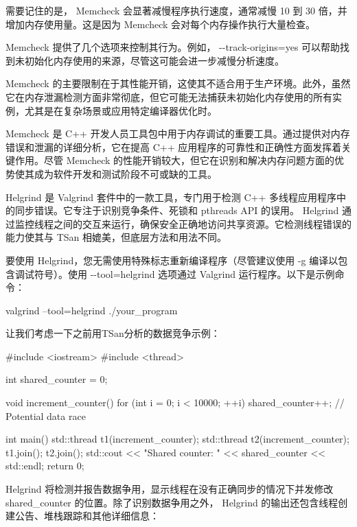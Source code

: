 
需要记住的是， Memcheck 会显著减慢程序执行速度，通常减慢 10 到 30 倍，并增加内存使用量。这是因为 Memcheck 会对每个内存操作执行大量检查。

Memcheck 提供了几个选项来控制其行为。例如， -{}-track-origins=yes 可以帮助找到未初始化内存使用的来源，尽管这可能会进一步减慢分析速度。

Memcheck 的主要限制在于其性能开销，这使其不适合用于生产环境。此外，虽然它在内存泄漏检测方面非常彻底，但它可能无法捕获未初始化内存使用的所有实例，尤其是在复杂场景或应用特定编译器优化时。

Memcheck 是 C++ 开发人员工具包中用于内存调试的重要工具。通过提供对内存错误和泄漏的详细分析，它在提高 C++ 应用程序的可靠性和正确性方面发挥着关键作用。尽管 Memcheck 的性能开销较大，但它在识别和解决内存问题方面的优势使其成为软件开发和测试阶段不可或缺的工具。


Helgrind 是 Valgrind 套件中的一款工具，专门用于检测 C++ 多线程应用程序中的同步错误。它专注于识别竞争条件、死锁和 pthreads API 的误用。 Helgrind 通过监控线程之间的交互来运行，确保安全正确地访问共享资源。它检测线程错误的能力使其与 TSan 相媲美，但底层方法和用法不同。

要使用 Helgrind，您无需使用特殊标志重新编译程序（尽管建议使用 -g 编译以包含调试符号）。使用 -{}-tool=helgrind 选项通过 Valgrind 运行程序。以下是示例命令：

\begin{shell}
valgrind --tool=helgrind ./your_program
\end{shell}

让我们考虑一下之前用TSan分析的数据竞争示例：

\begin{cpp}
#include <iostream>
#include <thread>

int shared_counter = 0;

void increment_counter() {
    for (int i = 0; i < 10000; ++i) {
        shared_counter++; // Potential data race
    }
}

int main() {
    std::thread t1(increment_counter);
    std::thread t2(increment_counter);
    t1.join();
    t2.join();
    std::cout << "Shared counter: " << shared_counter << std::endl;
    return 0;
}
\end{cpp}

Helgrind 将检测并报告数据争用，显示线程在没有正确同步的情况下并发修改 shared\_counter 的位置。除了识别数据争用之外， Helgrind 的输出还包含线程创建公告、堆栈跟踪和其他详细信息：

